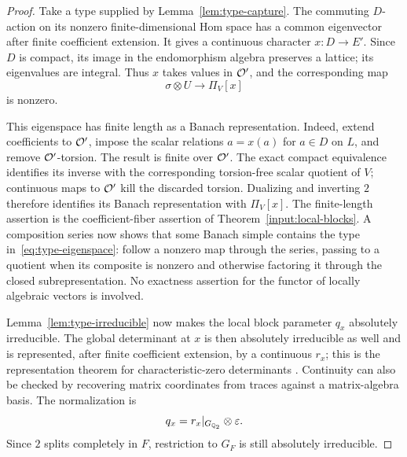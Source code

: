 \begin{proof}
Take a type supplied by Lemma~\ref{lem:type-capture}.  The commuting
$D$-action on its nonzero finite-dimensional Hom space has a common
eigenvector after finite coefficient extension.  It gives a continuous
character $x:D\to E'$.  Since $D$ is compact, its image in the
endomorphism algebra preserves a lattice; its eigenvalues are integral.
Thus $x$ takes values in $\mathcal O'$, and the corresponding map
\begin{equation}\label{eq:type-eigenspace}
                   \sigma\otimes U\longrightarrow\Pi_V[x]
\end{equation}
is nonzero.

This eigenspace has finite length as a Banach representation.
Indeed, extend coefficients to $\mathcal O'$, impose the scalar relations
$a=x(a)$ for $a\in D$ on $L$, and remove $\mathcal O'$-torsion.  The
result is finite over $\mathcal O'$.  The exact compact equivalence identifies
its inverse with the corresponding torsion-free scalar quotient of
$V$; continuous maps to $\mathcal O'$ kill the discarded torsion.
Dualizing and inverting $2$ therefore identifies its Banach
representation with $\Pi_V[x]$.  The finite-length assertion is the
coefficient-fiber assertion of Theorem~\ref{input:local-blocks}.
A composition series now shows that some Banach simple contains
the type in~\eqref{eq:type-eigenspace}: follow a nonzero map through
the series, passing to a quotient when its composite is nonzero and
otherwise factoring it through the closed subrepresentation.
No exactness assertion for the functor of locally algebraic vectors
is involved.

Lemma~\ref{lem:type-irreducible} now makes the local block parameter
$q_x$ absolutely irreducible.  The global determinant at $x$ is then absolutely
irreducible as well and is represented, after finite coefficient
extension, by a continuous $r_x$; this is the representation theorem
for characteristic-zero determinants
\cite[Theorem~2.12]{Chenevier2014}.
Continuity can also be checked by recovering matrix coordinates
from traces against a matrix-algebra basis.
The normalization is
\begin{equation}\label{eq:regular-local-normalization}
                   q_x=r_x|_{G_{\mathbb Q_2}}\otimes\varepsilon.
\end{equation}
Since $2$ splits completely in $F$, restriction to $G_F$ is still
absolutely irreducible.


\end{proof}
